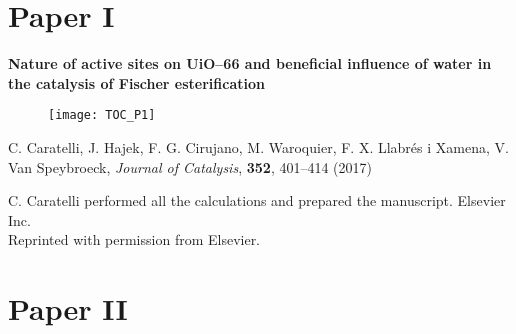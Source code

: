 \renewcommand\evenpagerightmark{{\scshape\small Published papers}}
\renewcommand\oddpageleftmark{{\scshape\small Chapter 5}}
\graphicspath{{figures/papers/}}



\clearpage

\section*{Paper I}

\vspace{0.1\textheight}
{
\large
\textbf{Nature of active sites on UiO--66 and beneficial influence of water in
the catalysis of Fischer esterification} }
\begin{figure}[h!]
	\centering
	\texttt{[image: TOC\_P1]}
\end{figure}
 
\noindent
C. Caratelli, J. Hajek, F. G. Cirujano, M. Waroquier, F. X. Llabr\'es i Xamena, V.
Van Speybroeck, \textit{Journal of Catalysis}, \textbf{352}, 401--414 (2017)
\npar

\vfill
\noindent C. Caratelli performed all the calculations and prepared the manuscript.
\npar
\noindent {} Elsevier Inc. \\
Reprinted with permission from Elsevier.

\clearpage{\pagestyle{empty}\cleardoublepage}
 
\clearpage{\pagestyle{empty}\cleardoublepage}
 
\clearpage{\pagestyle{empty}\cleardoublepage}


\section*{Paper II}

